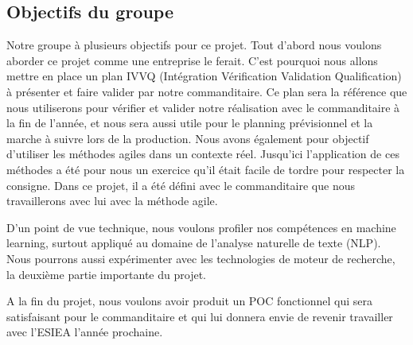 \subsection {Objectifs du groupe}
Notre groupe à plusieurs objectifs pour ce projet.
Tout d'abord nous voulons aborder ce projet comme une entreprise le ferait.
C'est pourquoi nous allons mettre en place un plan IVVQ (Intégration Vérification Validation Qualification) à présenter et faire valider par notre commanditaire.
Ce plan sera la référence que nous utiliserons pour vérifier et valider notre réalisation avec le commanditaire à la fin de l'année, et nous sera aussi utile pour le planning prévisionnel et la marche à suivre lors de la production.
Nous avons également pour objectif d'utiliser les méthodes agiles dans un contexte réel.
Jusqu'ici l'application de ces méthodes a été pour nous un exercice qu'il était facile de tordre pour respecter la consigne.
Dans ce projet, il a été défini avec le commanditaire que nous travaillerons avec lui avec la méthode agile.


D'un point de vue technique, nous voulons profiler nos compétences en machine learning, surtout appliqué au domaine de l'analyse naturelle de texte (NLP).
Nous pourrons aussi expérimenter avec les technologies de moteur de recherche, la deuxième partie importante du projet.


A la fin du projet, nous voulons avoir produit un POC fonctionnel qui sera satisfaisant pour le commanditaire et qui lui donnera envie de revenir travailler avec l'ESIEA l'année prochaine.





